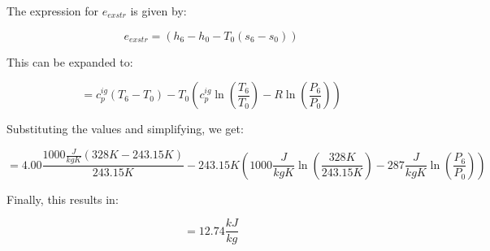 The expression for \( e_{exstr} \) is given by:

\[ e_{exstr} = (h_6 - h_0 - T_0(s_6 - s_0)) \]

This can be expanded to:

\[ = c_p^{ig}(T_6 - T_0) - T_0 \left( c_p^{ig} \ln \left( \frac{T_6}{T_0} \right) - R \ln \left( \frac{P_6}{P_0} \right) \right) \]

Substituting the values and simplifying, we get:

\[ = 4.00 \frac{1000 \frac{J}{kgK} (328K - 243.15K)}{243.15K} - 243.15K \left( 1000 \frac{J}{kgK} \ln \left( \frac{328K}{243.15K} \right) - 287 \frac{J}{kgK} \ln \left( \frac{P_6}{P_0} \right) \right) \]

Finally, this results in:

\[ = 12.74 \frac{kJ}{kg} \]